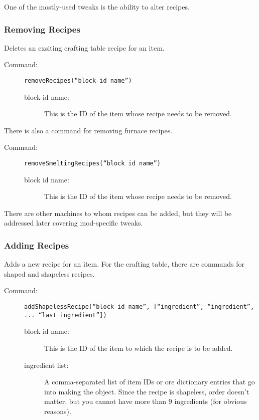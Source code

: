 \documentclass[letterpaper,titlepage,12pt]{article}
\begin{document}
One of the mostly-used tweaks is the ability to alter recipes.

\subsubsection{Removing Recipes}

Deletes an exsiting crafting table recipe for an item.

\begin{description}
\item[Command:] \texttt{removeRecipes(``block id name'')}
\begin{description}
\item [block id name:] This is the ID of the item whose recipe needs to be removed.
\end{description}
\end{description}

There is also a command for removing furnace recipes.

\begin{description}
\item[Command:] \texttt{removeSmeltingRecipes(``block id name'')}
\begin{description}
\item [block id name:] This is the ID of the item whose recipe needs to be removed.
\end{description}
\end{description}

There are other machines to whom recipes can be added, but they will be addressed later covering mod-specific tweaks.

\subsubsection{Adding Recipes}

Adds a new recipe for an item.  For the crafting table, there are commands for shaped and shapeless recipes.

\begin{description}
\item[Command:] \texttt{addShapelessRecipe(``block id name'', [``ingredient'', ``ingredient'', ... ``last ingredient''])}
\begin{description}
\item [block id name:] This is the ID of the item to which the recipe is to be added.
\item [ingredient list:] A comma-separated list of item IDs or ore dictionary entries that go into making the object.  Since the recipe is shapeless, order doesn't matter, but you cannot have more than 9 ingredients (for obvious reasons).
\end{description}
\end{description}
\end{document}
